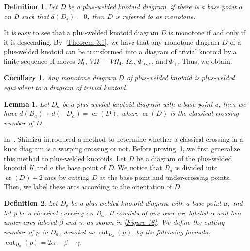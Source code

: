 \documentclass[11pt]{amsart}
\theoremstyle{noparens}
\newtheorem{corollary}{Corollary}[section]
\newtheorem{lemma}{Lemma}[section]
\newtheorem{definition}{Definition}[section]
\numberwithin{equation}{section}
\numberwithin{equation}{section}
\begin{document}
\begin{definition}
{\rm 
Let $D$ be a plus-welded knotoid diagram, if there is a base point $a$ on $D$ such that $d(D_a) = 0$, then $D$ is referred to as \textit{monotone}.
}
\end{definition}

It is easy to see that a plus-welded  knotoid  diagram $D$ is monotone if and only if it is descending. 
By~\cref{Theorem 3.1}, we have that any monotone diagram $D$ of a plus-welded knotoid can be transformed into a diagram of trivial knotoid by a finite  sequence of moves $\Omega_{1}$, $V\Omega_1 - V\Omega_4$, $\Omega_v$, $\Phi_{\text{over}}$, and $\Phi_+ $. Thus, we obtain: 

\begin{corollary} \label{Corollary 4.1}
Any monotone diagram $D$ of plus-welded knotoid is plus-welded equivalent to a diagram of trivial knotoid. 
\end{corollary}

\begin{lemma} \label{Lemma 4.1}
Let $D_a$ be a plus-welded knotoid diagram with a base point $a$, then we have $d(D_a) + d(-D_a) = \operatorname{cr}(D) $, where $\operatorname{cr}(D)$ is the classical crossing number of $D$. 
\end{lemma}

In~\citep{shimizu2010warping}, Shimizu introduced a method to determine whether a classical crossing in a knot diagram is a warping crossing or not. Before proving~\cref{Lemma 4.1}, we first generalize this method to plus-welded  knotoids. Let $D$ be a diagram of the plus-welded knotoid $K$ and $a$ the base point of $D$. We notice that $D_a$ is divided into $\operatorname{cr}(D)+ 2$ arcs by cutting $D$ at the base point and under-crossing points. Then, we label these arcs according to the orientation of $D$. 

\begin{definition} \label{Definition 4.2}
Let $D_a$ be a plus-welded knotoid diagram with a base point $a$, and let $p$ be a classical crossing on $D_a$. It consists of one over-arc labeled $\alpha$ and two under-arcs labeled $\beta$ and $\gamma$, as shown in \cref{Figure 18}. We define the cutting number of $p$ in $D_a$, denoted as $\operatorname{cut}_{D_a}(p)$, by the following formula: $\operatorname{cut}_{D_a}(p)=2\alpha - \beta - \gamma$.
\end{definition} 
\end{document}
